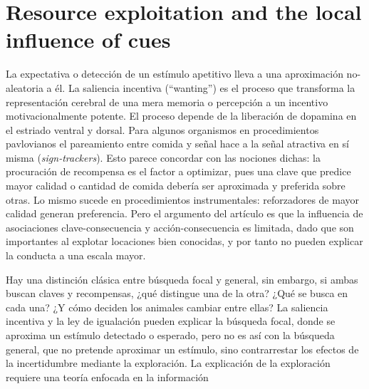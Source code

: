 \documentclass[a4paper,12pt]{article}
\begin{document}
\section{Resource exploitation and the local influence of cues}

La expectativa o detección de un estímulo apetitivo lleva a una aproximación no-aleatoria a él.
La saliencia incentiva (``wanting'') es el proceso que transforma la representación cerebral de una mera memoria o percepción a un incentivo motivacionalmente potente.
El proceso depende de la liberación de dopamina en el estriado ventral y dorsal.
Para algunos organismos en procedimientos pavlovianos el pareamiento entre comida y señal hace a la señal atractiva en sí misma ({\itshape sign-trackers}).
Esto parece concordar con las nociones dichas: la procuración de recompensa es el factor a optimizar, pues una clave que predice mayor calidad o cantidad de comida debería ser aproximada y preferida sobre otras.
Lo mismo sucede en procedimientos instrumentales: reforzadores de mayor calidad generan preferencia.
Pero el argumento del artículo es que la influencia de asociaciones clave-consecuencia y acción-consecuencia es limitada, dado que son importantes al explotar locaciones bien conocidas, y por tanto no pueden explicar la conducta a una escala mayor.

Hay una distinción clásica entre búsqueda focal y general, sin embargo, si ambas buscan claves y recompensas, ¿qué distingue una de la otra? ¿Qué se busca en cada una? ¿Y cómo deciden los animales cambiar entre ellas? La saliencia incentiva y la ley de igualación pueden explicar la búsqueda focal, donde se aproxima un estímulo detectado o esperado, pero no es así con la búsqueda general, que no pretende aproximar un estímulo, sino contrarrestar los efectos de la incertidumbre mediante la exploración.
La explicación de la exploración requiere una teoría enfocada en la información
\end{document}
